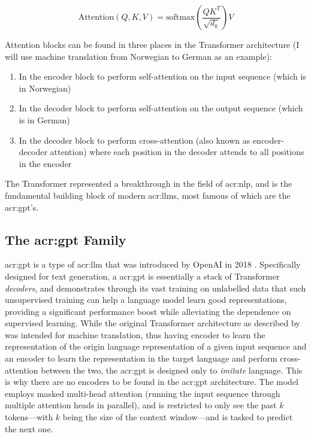 \begin{equation}
    \text{Attention}(Q, K, V) = \text{softmax}\left(\frac{QK^T}{\sqrt{d_k}}\right)V
    \label{eq:attention}
\end{equation}

Attention blocks can be found in three places in the Transformer architecture \citep[5]{vaswaniAttentionAllYou2017} (I will use machine translation from Norwegian to German as an example):

\begin{enumerate}
    \item In the encoder block to perform self-attention on the input sequence (which is in Norwegian)
    \item In the decoder block to perform self-attention on the output sequence (which is in German)
    \item In the decoder block to perform cross-attention (also known as encoder-decoder attention) where each position in the decoder attends to all positions in the encoder
\end{enumerate}

The Transformer represented a breakthrough in the field of \gls{acr:nlp}, and is the fundamental building block of modern \glspl{acr:llm}, most famous of which are the \acrshort{acr:gpt}'s.

\subsection[The GPT Family]{The \acrshort{acr:gpt} Family}\label{subsec:gpt}

\gls{acr:gpt} is a type of \gls{acr:llm} that was introduced by OpenAI in 2018 \citep{radfordImprovingLanguageUnderstanding2018}. Specifically designed for text generation, a \acrshort{acr:gpt} is essentially a stack of Transformer \textit{decoders}, and demonstrates through its vast training on unlabelled data that such unsupervised training can help a language model learn good representations, providing a significant performance boost while alleviating the dependence on supervised learning. While the original Transformer architecture as described by \cite{vaswaniAttentionAllYou2017} was intended for machine translation, thus having encoder to learn the representation of the origin language representation of a given input sequence and an encoder to learn the representation in the target language and perform cross-attention between the two, the \acrshort{acr:gpt} is designed only to \textit{imitate} language. This is why there are no encoders to be found in the \acrshort{acr:gpt} architecture. The model employs masked multi-head attention (running the input sequence through multiple attention heads in parallel), and is restricted to only see the past $k$ tokens---with $k$ being the size of the context window---and is tasked to predict the next one.

